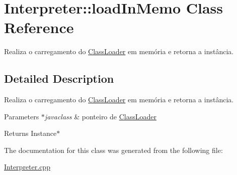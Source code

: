 \hypertarget{class_interpreter_1_1load_in_memo}{}\section{Interpreter\+:\+:load\+In\+Memo Class Reference}
\label{class_interpreter_1_1load_in_memo}


Realiza o carregamento do \hyperlink{class_class_loader}{Class\+Loader} em memória e retorna a instância.  




\subsection{Detailed Description}
Realiza o carregamento do \hyperlink{class_class_loader}{Class\+Loader} em memória e retorna a instância. 


\begin{DoxyParams}{Parameters}
{\em $\ast$javaclass} & ponteiro de \hyperlink{class_class_loader}{Class\+Loader} \\
\hline
\end{DoxyParams}
\begin{DoxyReturn}{Returns}
Instance$\ast$ 
\end{DoxyReturn}


The documentation for this class was generated from the following file\+:\begin{DoxyCompactItemize}
\item 
\hyperlink{_interpreter_8cpp}{Interpreter.\+cpp}\end{DoxyCompactItemize}
